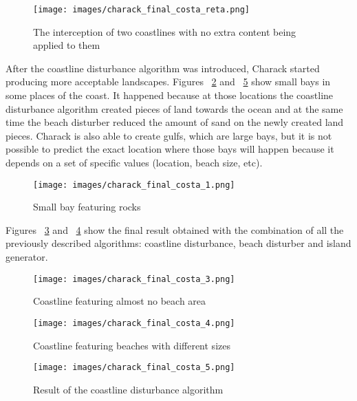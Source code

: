 \documentclass[10pt, conference, compsocconf]{IEEEtran}
\begin{document}
\begin{figure}
\centering
\texttt{[image: images/charack\_final\_costa\_reta.png]}
\caption{The interception of two coastlines with no extra content being applied to them}
\label{fig:charack_final_costa_reta}
\end{figure}

After the coastline disturbance algorithm was introduced, Charack started producing more acceptable landscapes. Figures ~\ref{fig:charack_final_costa_1} and ~\ref{fig:charack_final_costa_5} show small bays in some places of the coast. It happened because at those locations the coastline disturbance algorithm created pieces of land towards the ocean and at the same time the beach disturber reduced the amount of sand on the newly created land pieces. Charack is also able to create gulfs, which are large bays, but it is not possible to predict the exact location where those bays will happen because it depends on a set of specific values (location, beach size, etc).

\begin{figure}
\centering
\texttt{[image: images/charack\_final\_costa\_1.png]}
\caption{Small bay featuring rocks}
\label{fig:charack_final_costa_1}
\end{figure}

Figures ~\ref{fig:charack_final_costa_3} and ~\ref{fig:charack_final_costa_4} show the final result obtained with the combination of all the previously described algorithms: coastline disturbance, beach disturber and island generator.


\begin{figure}
\centering
\texttt{[image: images/charack\_final\_costa\_3.png]}
\caption{Coastline featuring almost no beach area}
\label{fig:charack_final_costa_3}
\end{figure}

\begin{figure}
\centering
\texttt{[image: images/charack\_final\_costa\_4.png]}
\caption{Coastline featuring beaches with different sizes}
\label{fig:charack_final_costa_4}
\end{figure}

\begin{figure}
\centering
\texttt{[image: images/charack\_final\_costa\_5.png]}
\caption{Result of the coastline disturbance algorithm}
\label{fig:charack_final_costa_5}
\end{figure}
\end{document}
